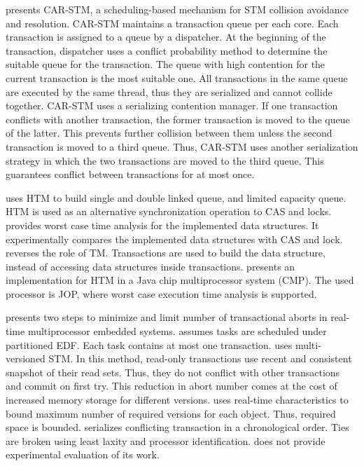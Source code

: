 \documentclass[12pt,english]{report}
\begin{document}
\cite{Dolev:2008:CSC:1400751.1400769} presents CAR-STM, a scheduling-based
mechanism for STM collision avoidance and resolution. CAR-STM maintains
a transaction queue per each core. Each transaction is assigned to
a queue by a dispatcher. At the beginning of the transaction, dispatcher
uses a conflict probability method to determine the suitable queue
for the transaction. The queue with high contention for the current
transaction is the most suitable one. All transactions in the same
queue are executed by the same thread, thus they are serialized and
cannot collide together. CAR-STM uses a serializing contention manager.
If one transaction conflicts with another transaction, the former
transaction is moved to the queue of the latter. This prevents further
collision between them unless the second transaction is moved to a
third queue. Thus, CAR-STM uses another serialization strategy in
which the two transactions are moved to the third queue. This guarantees
conflict between transactions for at most once.

\cite{Meawad:2011:RWQ:2043910.2043912} uses HTM to build single and
double linked queue, and limited capacity queue. HTM is used as an
alternative synchronization operation to CAS and locks. \cite{Meawad:2011:RWQ:2043910.2043912}
provides worst case time analysis for the implemented data structures.
It experimentally compares the implemented data structures with CAS
and lock. \cite{Meawad:2011:RWQ:2043910.2043912} reverses the role
of TM. Transactions are used to build the data structure, instead of
accessing data structures inside transactions. \cite{5694263} presents
an implementation for HTM in a Java chip multiprocessor system (CMP).
The used processor is JOP, where worst case execution time analysis
is supported.

\cite{6068352} presents two steps to minimize and limit number of
transactional aborts in real-time multiprocessor embedded systems.
\cite{6068352} assumes tasks are scheduled under partitioned EDF.
Each task contains at most one transaction. \cite{6068352} uses multi-versioned
STM. In this method, read-only transactions use recent and consistent
snapshot of their read sets. Thus, they do not conflict with other
transactions and commit on first try. This reduction in abort number
comes at the cost of increased memory storage for different versions.
\cite{6068352} uses real-time characteristics to bound maximum number
of required versions for each object. Thus, required space is bounded.
\cite{6068352} serializes conflicting transaction in a chronological
order. Ties are broken using least laxity and processor identification.
\cite{6068352} does not provide experimental evaluation of its work. 
\end{document}
